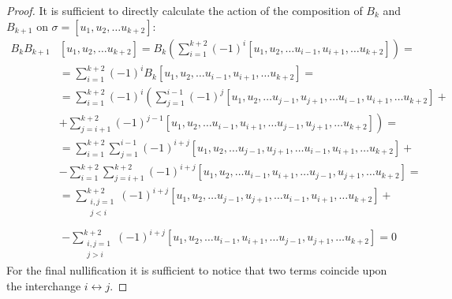 
\begin{proof}
      It is sufficient to directly calculate the action of the composition of \(B_k\) and \( B_{k+1}\) on \(\sigma = [u_1, u_2, \dots u_{k+2}]\):
      \begin{equation}
            \begin{aligned}
                  B_k B_{k+1} & [ u_1, u_2, \dots u_{k+2} ]  = B_k \left( \sum_{i=1}^{k+2} \left( -1 \right)^i [u_1, u_2, \dots u_{i-1}, u_{i+1}, \dots u_{k+2} ] \right) = \\
                  & =  \sum_{i=1}^{k+2} \left( -1 \right)^i B_k [u_1, u_2, \dots u_{i-1}, u_{i+1}, \dots u_{k+2}] = \\
                  & = \sum_{i=1}^{k+2} \left( -1 \right)^i \left( 
                  \sum_{j=1}^{i-1} (-1)^j [u_1, u_2, \dots u_{j-1}, u_{j+1}, \dots u_{i-1}, u_{i+1}, \dots u_{k+2}] + \right. \\
                  & \left. + \sum_{j=i+1}^{k+2} (-1)^{j-1} [u_1, u_2, \dots u_{i-1}, u_{i+1}, \dots u_{j-1}, u_{j+1}, \dots u_{k+2}] 
                  \right) =  \\
                  & = \sum_{i=1}^{k+2}
                  \sum_{j=1}^{i-1} (-1)^{i+j} [u_1, u_2, \dots u_{j-1}, u_{j+1}, \dots u_{i-1}, u_{i+1}, \dots u_{k+2}] + \\
                  &  - \sum_{i=1}^{k+2}\sum_{j=i+1}^{k+2} (-1)^{i+j} [u_1, u_2, \dots u_{i-1}, u_{i+1}, \dots u_{j-1}, u_{j+1}, \dots u_{k+2}] 
                   = \\
                   & = \sum_{\substack{i, j = 1\\ j<i}}^{k+2}
                  (-1)^{i+j} [u_1, u_2, \dots u_{j-1}, u_{j+1}, \dots u_{i-1}, u_{i+1}, \dots u_{k+2}] + \\
            \end{aligned}
      \end{equation}
      \begin{equation}
            \begin{aligned}
                  \phantom{B_k B_{k+1}}
                  &  - \sum_{\substack{i, j =1 \\ j>i}}^{k+2} (-1)^{i+j} [u_1, u_2, \dots u_{i-1}, u_{i+1}, \dots u_{j-1}, u_{j+1}, \dots u_{k+2}] 
                   = 0
            \end{aligned}
      \end{equation}
      For the final nullification it is sufficient to notice that two terms coincide upon the interchange \( i \leftrightarrow j\).
\end{proof}

